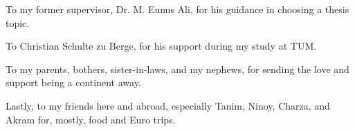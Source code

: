 \vspace{2mm} To my former supervisor, Dr. M. Eunus Ali, for his guidance in choosing a thesis topic.

\vspace{2mm} To Christian Schulte zu Berge, for his support during my study at TUM.

\vspace{2mm} To my parents, bothers, sister-in-laws, and my nephews, for sending the love and support being a continent away.

\vspace{2mm} Lastly, to my friends here and abroad, especially Tanim, Ninoy, Charza, and Akram for, mostly, food and Euro trips.

